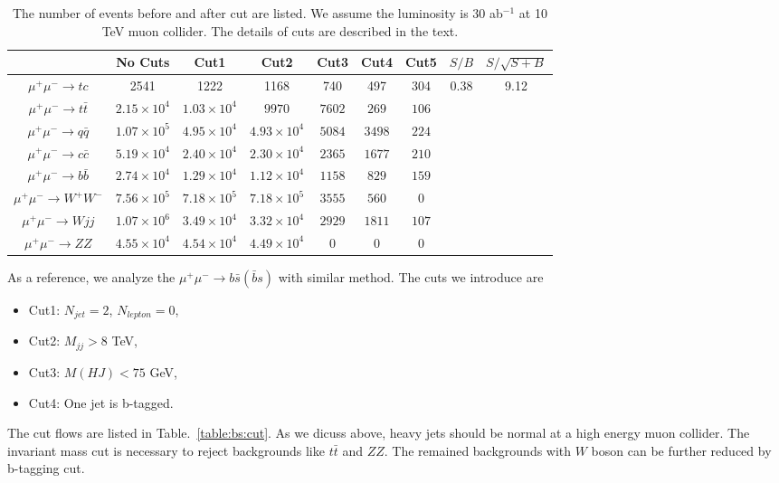 \documentclass[a4paper,11pt]{article}
\begin{document}
\begin{center}
\begin{table}
  \begin{center}
  \begin{tabular}{c|c|c|c|c|c|c|c|c}
  \hline
  &  No Cuts  &  Cut1  &    Cut2   &  Cut3  & Cut4 & Cut5 &  $S/B$  &    $S/\sqrt{S+B}$   \\
  \hline
  $\mu^+\mu^-\to tc$   &  2541 & 1222    &     1168  &  740  &  497 & 304  &  \multirow{8}{*}{0.38} & \multirow{8}{*}{9.12} \\
  $\mu^+\mu^-\to t\bar{t}$     &   $2.15\times{10^4}$  &  $1.03\times{10^4}$    &     $9970$  &  $7602$ & $269$ & $106$  & & \\
  $\mu^+\mu^-\to q\bar{q}$     &   $1.07\times{10^5}$  &   $4.95\times{10^4}$  & $4.93\times{10^4}$  &    $5084$    &  $3498$ & $224$ &   &  \\
  $\mu^+\mu^-\to c\bar{c}$     &   $5.19\times{10^4}$  &  $2.40\times{10^4}$ &  $2.30\times{10^4}$  &    $2365$    &  $1677$ & $210$ &   &  \\
  $\mu^+\mu^-\to b\bar{b}$     &   $2.74\times{10^4}$   &  $1.29\times{10^4}$ & $1.12\times{10^4}$  &    $1158$    &  $829$ & $159$ &   &  \\
  $\mu^+\mu^-\to W^+W^-$  & $7.56\times{10^5}$   & $7.18\times{10^5}$ & $7.18\times{10^5}$  & $3555$ &  $560$ & $0$ & & \\
  $\mu^+\mu^-\to Wjj$  & $1.07\times{10^6}$  & $3.49\times{10^4}$ & $3.32\times{10^4}$  &  $2929$   &  $1811$ & $107$  & & \\
  $\mu^+\mu^-\to ZZ$  & $4.55\times{10^4}$  & $4.54\times{10^4}$ & $4.49\times{10^4}$  &  $0$   &  $0$ & $0$  &  & \\
  \hline
  \end{tabular}
  \end{center}
  \caption{The number of events before and after cut are listed. We assume the luminosity is $30$ ab$^{-1}$ at 10 TeV muon collider. The details of cuts are described in the text.\label{table:tc:cut}}
\end{table}
\end{center}

As a reference, we analyze the $\mu^+\mu^-\to b\bar{s}(\bar{b}s)$ with similar method. 
The cuts we introduce are
\begin{itemize}
  \item Cut1: $N_{jet}=2$, $N_{lepton}=0$,
  \item Cut2: $M_{jj}>8$ TeV,
  \item Cut3: $M(HJ)<75$ GeV,
  \item Cut4: One jet is b-tagged.
\end{itemize} 
The cut flows are listed in Table.~\ref{table:bs:cut}.
As we dicuss above, heavy jets should be normal at a high energy muon collider.
The invariant mass cut is necessary to reject backgrounds like $t\bar{t}$ and $ZZ$.
The remained backgrounds with $W$ boson can be further reduced by b-tagging cut.
\end{document}
